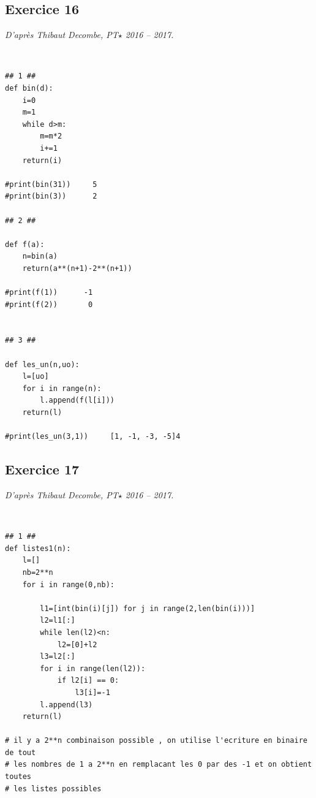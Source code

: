 \documentclass[10pt,fleqn]{article} %
\begin{document}
\subsection*{Exercice 16}
\textit{D'après Thibaut Decombe, PT$\star$ 2016 -- 2017.}
\begin{corrige}
$\quad$
\begin{lstlisting}
## 1 ##
def bin(d):
    i=0
    m=1
    while d>m:
        m=m*2
        i+=1
    return(i)

#print(bin(31))     5
#print(bin(3))      2

## 2 ##

def f(a):
    n=bin(a)
    return(a**(n+1)-2**(n+1))

#print(f(1))      -1
#print(f(2))       0


## 3 ##

def les_un(n,uo):
    l=[uo]
    for i in range(n):
        l.append(f(l[i]))
    return(l)

#print(les_un(3,1))     [1, -1, -3, -5]4
\end{lstlisting}
\end{corrige}


\subsection*{Exercice 17}
\textit{D'après Thibaut Decombe, PT$\star$ 2016 -- 2017.}
\begin{corrige}
$\quad$
\begin{lstlisting}
## 1 ##
def listes1(n):
    l=[]
    nb=2**n
    for i in range(0,nb):
        
        l1=[int(bin(i)[j]) for j in range(2,len(bin(i)))]
        l2=l1[:]
        while len(l2)<n:
            l2=[0]+l2
        l3=l2[:]
        for i in range(len(l2)):
            if l2[i] == 0:
                l3[i]=-1
        l.append(l3)
    return(l)

# il y a 2**n combinaison possible , on utilise l'ecriture en binaire de tout
# les nombres de 1 a 2**n en remplacant les 0 par des -1 et on obtient toutes
# les listes possibles
\end{lstlisting}
\end{corrige}
\end{document}
